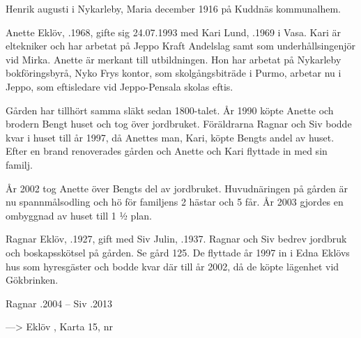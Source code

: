 Henrik  augusti i Nykarleby, Maria  december 1916 på Kuddnäs kommunalhem.




Anette Eklöv, .1968, gifte sig 24.07.1993 med Kari Lund, .1969 i Vasa. Kari är eltekniker och har arbetat på Jeppo Kraft Andelslag samt som underhållsingenjör vid Mirka. Anette är merkant till utbildningen. Hon 	har arbetat på Nykarleby bokföringsbyrå, Nyko Frys kontor, som skolgångsbiträde i Purmo, arbetar nu i Jeppo, som eftisledare vid Jeppo-Pensala skolas eftis.
\begin{jhchildren}
  \item {}
  \item {}
  \item {}
\end{jhchildren}
Gården har tillhört samma släkt sedan 1800-talet. År 1990 köpte Anette och brodern Bengt huset och tog över jordbruket. Föräldrarna Ragnar och Siv bodde kvar i huset till år 1997, då Anettes man, Kari, köpte Bengts andel av huset. Efter en brand renoverades gården och Anette och Kari flyttade in med sin familj.

År 2002 tog Anette över Bengts del av jordbruket. Huvudnäringen på gården är nu spannmålsodling och hö för familjens 2 hästar och 5 får. År 2003 gjordes en ombyggnad av huset till 1 ½ plan.


Ragnar Eklöv, .1927, gift med Siv Julin, .1937. Ragnar och Siv bedrev jordbruk och boskapsskötsel på gården. Se gård 125. De flyttade år 1997 in i Edna Eklövs hus som hyresgäster och bodde kvar där till år 2002, då de köpte lägenhet vid Gökbrinken.

Ragnar .2004  --  Siv .2013


---> Eklöv 	, Karta 15,   nr 



